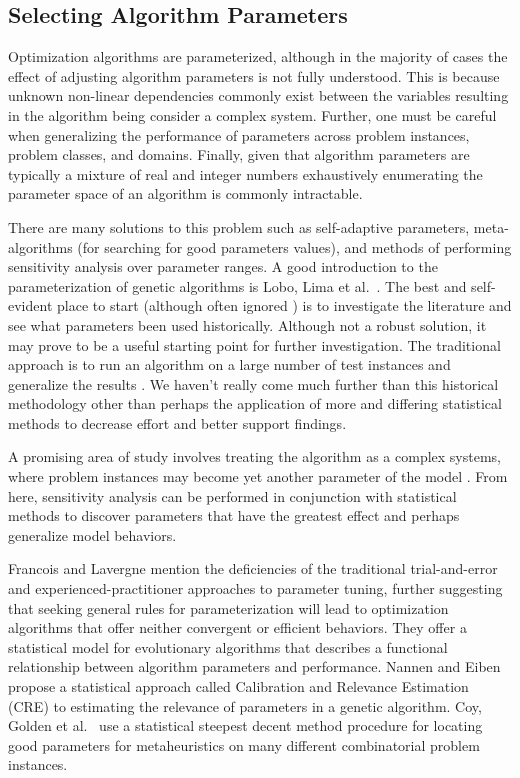 % 
% 
\subsection{Selecting Algorithm Parameters}
Optimization algorithms are parameterized, although in the majority of cases the effect of adjusting algorithm parameters is not fully understood. This is because unknown non-linear dependencies commonly exist between the variables resulting in the algorithm being consider a complex system. Further, one must be careful when generalizing the performance of parameters across problem instances, problem classes, and domains. Finally, given that algorithm parameters are typically a mixture of real and integer numbers exhaustively enumerating the parameter space of an algorithm is commonly intractable.

There are many solutions to this problem such as self-adaptive parameters, meta-algorithms (for searching for good parameters values), and methods of performing sensitivity analysis over parameter ranges. A good introduction to the parameterization of genetic algorithms is Lobo, Lima et al.\ \cite{Lobo2007}. The best and self-evident place to start (although often ignored \cite{Eiben2002}) is to investigate the literature and see what parameters been used historically. Although not a robust solution, it may prove to be a useful starting point for further investigation. The traditional approach is to run an algorithm on a large number of test instances and generalize the results \cite{Schaffer1989}. We haven't really come much further than this historical methodology other than perhaps the application of more and differing statistical methods to decrease effort and better support findings.

A promising area of study involves treating the algorithm as a complex systems, where problem instances may become yet another parameter of the model \cite{Saltelli2002, Campolongo2000}. From here, sensitivity analysis can be performed in conjunction with statistical methods to discover parameters that have the greatest effect \cite{Chan1997} and perhaps generalize model behaviors.

Francois and Lavergne \cite{Francois2001} mention the deficiencies of the traditional trial-and-error and experienced-practitioner approaches to parameter tuning, further suggesting	that seeking general rules for parameterization will lead to optimization algorithms that offer neither convergent or efficient behaviors. They offer a statistical model for evolutionary algorithms that describes a functional relationship between algorithm parameters and performance. Nannen and Eiben \cite{Nannen2007, Nannen2006} propose a statistical approach called Calibration and Relevance Estimation (CRE) to estimating the relevance of parameters in a genetic algorithm. Coy, Golden et al.\ \cite{Coy2001} use a statistical steepest decent method procedure for locating good parameters for metaheuristics on many different combinatorial problem instances.

